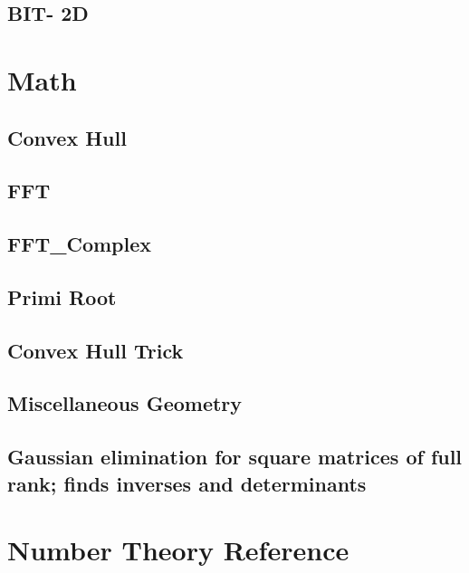 \documentclass[12pt]{extarticle}
\begin{document}
\begin{multicols*}{2}
\subsection{BIT- 2D} %



\section{Math}

\subsection{Convex Hull} %


\subsection{FFT} %


\subsection{FFT_Complex} %


\subsection{Primi Root } %


\subsection{Convex Hull Trick} %



\subsection{Miscellaneous Geometry} %


\subsection{Gaussian elimination for square matrices of full rank; finds
inverses and determinants} %


\section{Number Theory Reference}


\end{multicols*}
\end{document}
